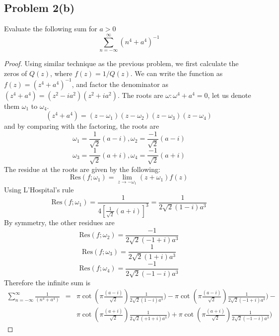 \documentclass{article}[12pt]
\begin{document}
\subsection*{Problem 2(b)} Evaluate the following sum for $a>0$
\[
\sum_{n=-\infty}^\infty (n^4+a^4)^{-1}
\]
\begin{proof}
Using similar technique as the previous problem, we first calculate the
zeros of $Q(z)$, where $f(z)=1/Q(z)$.
We can write the function as $f(z)=(z^4+a^4)^{-1}$, and factor the denominator
as $(z^4+a^4)=(z^2-ia^2)(z^2+ia^2)$.
The roots are $\omega:\omega^4+a^4=0$, let us denote them $\omega_1$
to $\omega_4$.
\[
(z^4+a^4) = (z-\omega_1)(z-\omega_2)(z-\omega_3)(z-\omega_4)
\]
and by comparing with the factoring, the roots are
\[
\omega_1 = \frac{1}{\sqrt{2}}(a-i), \omega_2 = \frac{-1}{\sqrt{2}}(a-i)
\]
\[
\omega_3 = \frac{1}{\sqrt{2}}(a+i), \omega_4 = \frac{-1}{\sqrt{2}}(a+i)
\]
The residue at the roots are given by the following:
\[
\mbox{Res}(f;\omega_1) = \lim_{z\to -\omega_1} (z+\omega_1)f(z)
\]
Using L'Hospital's rule
\[
\mbox{Res}(f;\omega_1) = \frac{1}{4\left[ \frac{1}{\sqrt{2}}(a+i)\right]^3} =
\frac{1}{2\sqrt{2}(1-i)a^3}
\]
By symmetry, the other residues are
\[
\mbox{Res}(f;\omega_2) = \frac{-1}{2\sqrt{2}(-1+i)a^3}
\]
\[
\mbox{Res}(f;\omega_3) = \frac{1}{2\sqrt{2}(1+i)a^3}
\]
\[
\mbox{Res}(f;\omega_4) = \frac{-1}{2\sqrt{2}(-1-i)a^3}
\]
Therefore the infinite sum is
\begin{eqnarray}
\sum_{n=-\infty}^\infty \frac{1}{(n^4+a^4)} & = & 
\pi\cot(\pi \frac{(a-i)}{\sqrt{2}}) \frac{1}{2\sqrt{2}(1-i)a^3}) -
\pi\cot(\pi \frac{(a-i)}{\sqrt{2}}) \frac{1}{2\sqrt{2}(-1+i)a^3}) -\nonumber \\
& & \pi\cot(\pi \frac{(a+i)}{\sqrt{2}}) \frac{1}{2\sqrt{2}(+1+i)a^3}) +
\pi\cot(\pi \frac{(a+i)}{\sqrt{2}}) \frac{1}{2\sqrt{2}(-1-i)a^3}) \nonumber
\end{eqnarray}
\end{proof}
\end{document}
